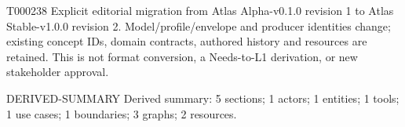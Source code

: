 \documentclass[11pt,a4paper]{article}
\begin{document}
\begin{atlasparagraph}{T000238}
Explicit editorial migration from Atlas Alpha-v0.1.0 revision 1 to Atlas Stable-v1.0.0 revision 2. Model/profile/envelope and producer identities change; existing concept IDs, domain contracts, authored history and resources are retained. This is not format conversion, a Needs-to-L1 derivation, or new stakeholder approval.
\end{atlasparagraph}
\begin{atlasderived}{DERIVED-SUMMARY}
Derived summary: 5 sections; 1 actors; 1 entities; 1 tools; 1 use cases; 1 boundaries; 3 graphs; 2 resources.
\end{atlasderived}
%
\end{document}
